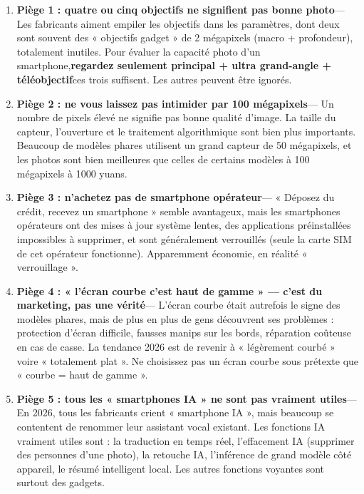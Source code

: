 \begin{enumerate}
  \item \textbf{Piège 1 : quatre ou cinq objectifs ne signifient pas bonne photo}— Les fabricants aiment empiler les objectifs dans les paramètres, dont deux sont souvent des « objectifs gadget » de 2 mégapixels (macro + profondeur), totalement inutiles. Pour évaluer la capacité photo d'un smartphone,\textbf{regardez seulement principal + ultra grand-angle + téléobjectif}ces trois suffisent. Les autres peuvent être ignorés.
  \item \textbf{Piège 2 : ne vous laissez pas intimider par 100 mégapixels}— Un nombre de pixels élevé ne signifie pas bonne qualité d'image. La taille du capteur, l'ouverture et le traitement algorithmique sont bien plus importants. Beaucoup de modèles phares utilisent un grand capteur de 50 mégapixels, et les photos sont bien meilleures que celles de certains modèles à 100 mégapixels à 1000 yuans.
  \item \textbf{Piège 3 : n'achetez pas de smartphone opérateur}— « Déposez du crédit, recevez un smartphone » semble avantageux, mais les smartphones opérateurs ont des mises à jour système lentes, des applications préinstallées impossibles à supprimer, et sont généralement verrouillés (seule la carte SIM de cet opérateur fonctionne). Apparemment économie, en réalité « verrouillage ».
  \item \textbf{Piège 4 : « l'écran courbe c'est haut de gamme » — c'est du marketing, pas une vérité}— L'écran courbe était autrefois le signe des modèles phares, mais de plus en plus de gens découvrent ses problèmes : protection d'écran difficile, fausses manips sur les bords, réparation coûteuse en cas de casse. La tendance 2026 est de revenir à « légèrement courbé » voire « totalement plat ». Ne choisissez pas un écran courbe sous prétexte que « courbe = haut de gamme ».
  \item \textbf{Piège 5 : tous les « smartphones IA » ne sont pas vraiment utiles}— En 2026, tous les fabricants crient « smartphone IA », mais beaucoup se contentent de renommer leur assistant vocal existant. Les fonctions IA vraiment utiles sont : la traduction en temps réel, l'effacement IA (supprimer des personnes d'une photo), la retouche IA, l'inférence de grand modèle côté appareil, le résumé intelligent local. Les autres fonctions voyantes sont surtout des gadgets.
\end{enumerate}


